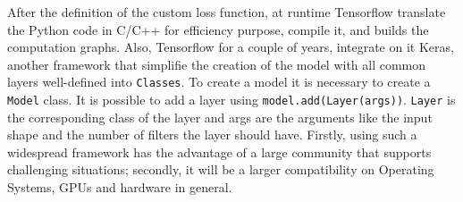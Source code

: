 \documentclass[12pt]{report}
\begin{document}
After the definition of the custom loss function, at runtime Tensorflow translate the Python code in C/C++ for efficiency purpose, compile it, and builds the computation graphs.
Also, Tensorflow for a couple of years, integrate on it Keras, another framework that simplifie the creation of the model with 
all common layers well-defined into \texttt{Classes}.
To create a model it is necessary to create a \texttt{Model} class.
It is possible to add a layer using \texttt{model.add(Layer(args))}.
\texttt{Layer} is the corresponding class of the layer and args are the arguments like the input shape and the number of filters the layer should have. 
Firstly, using such a widespread framework has the advantage of a large community that supports challenging situations;
secondly, it will be a larger compatibility on Operating Systems, GPUs and hardware in general.
\end{document}
